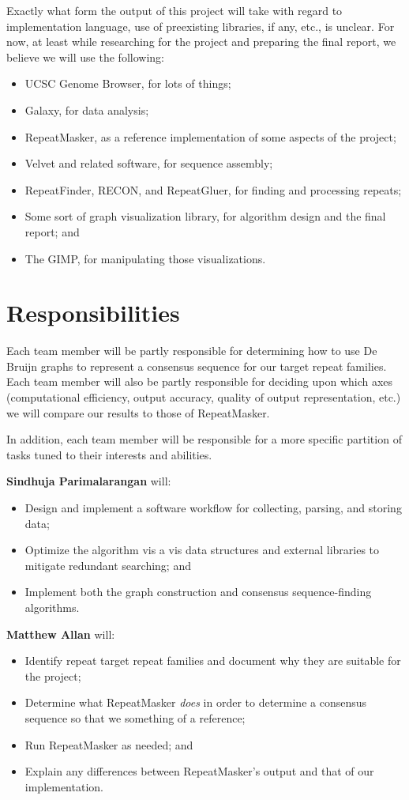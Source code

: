 \documentclass[dvips,12pt]{article}
\begin{document}
Exactly what form the output of this project will take with regard to
implementation language, use of preexisting libraries, if any, etc., is
unclear.  For now, at least while researching for the project and
preparing the final report, we believe we will use the following:
\begin{itemize}
\item UCSC Genome Browser,
  for lots of things;
\item Galaxy,
  for data analysis;
\item RepeatMasker,
  as a reference implementation of some aspects of the project;
\item Velvet and related software,
  for sequence assembly;
\item RepeatFinder, RECON, and RepeatGluer,
  for finding and processing repeats;
\item Some sort of graph visualization library, for algorithm design and
  the final report; and
\item The GIMP, for manipulating those visualizations.
\end{itemize}

\section{Responsibilities}

Each team member will be partly responsible for determining how to use
De Bruijn graphs to represent a consensus sequence for our target repeat
families.  Each team member will also be partly responsible for deciding
upon which axes (computational efficiency, output accuracy, quality of
output representation, etc.) we will compare our results to those of
RepeatMasker.

In addition, each team member will be responsible for a more specific
partition of tasks tuned to their interests and abilities.

\textbf{Sindhuja Parimalarangan} will:
\begin{itemize}
\item Design and implement a software workflow for collecting, parsing,
  and storing data;
\item Optimize the algorithm vis a vis data structures and external
  libraries to mitigate redundant searching; and
\item Implement both the graph construction and consensus
  sequence-finding algorithms.
\end{itemize}

\textbf{Matthew Allan} will:
\begin{itemize}
\item Identify repeat target repeat families and document why they are
  suitable for the project;
\item Determine what RepeatMasker \emph{does} in order to determine a
  consensus sequence so that we something of a reference;
\item Run RepeatMasker as needed; and
\item Explain any differences between RepeatMasker's output and that of
  our implementation.
\end{itemize}
\end{document}
